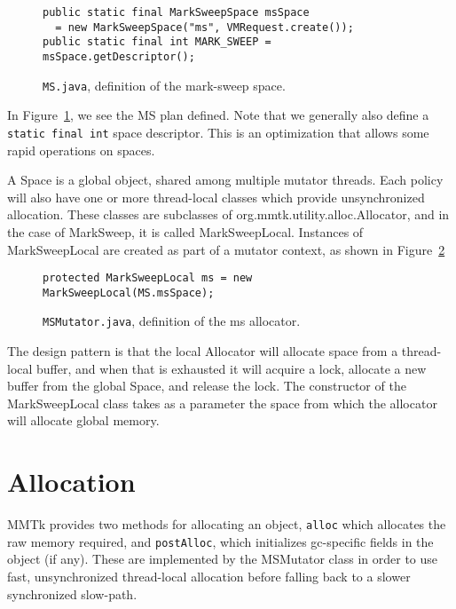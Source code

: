 \begin{figure}[h!]
\begin{lstlisting}
public static final MarkSweepSpace msSpace 
  = new MarkSweepSpace("ms", VMRequest.create());
public static final int MARK_SWEEP = msSpace.getDescriptor();
\end{lstlisting}
\caption{\lstinline|MS.java|, definition of the mark-sweep space.}
\label{fig:gc:ms-space}
\end{figure}
In Figure~\ref{fig:gc:ms-space}, we see the MS plan defined.  Note that we
generally also define a \lstinline|static final int| space descriptor.  This is
an optimization that allows some rapid operations on spaces.

A Space is a global object, shared among multiple mutator threads.  
Each policy will also have one or more thread-local classes which provide unsynchronized allocation.  
These classes are subclasses of org.mmtk.utility.alloc.Allocator, and in the case of MarkSweep, 
it is called MarkSweepLocal.  Instances of MarkSweepLocal are created as 
part of a mutator context, as shown in Figure~\ref{fig:gc:ms-allocator}

\begin{figure}[h!]
\begin{lstlisting}
protected MarkSweepLocal ms = new MarkSweepLocal(MS.msSpace);
\end{lstlisting}
\caption{\lstinline|MSMutator.java|, definition of the ms allocator.}
\label{fig:gc:ms-allocator}
\end{figure}
The design pattern is that the local Allocator will allocate space 
from a thread-local buffer, and when that is exhausted it will 
acquire a lock, allocate a new buffer from the global Space, and release the lock.  
The constructor of the MarkSweepLocal class takes as a parameter the space from
which the allocator will allocate global memory.

\section{Allocation}

MMTk provides two methods for allocating an object, \lstinline|alloc| which
allocates the raw memory required, and \lstinline|postAlloc|, which initializes
gc-specific fields in the object (if any).
These are implemented by the MSMutator class in order
to use fast, unsynchronized thread-local allocation before falling back to a 
slower synchronized slow-path.

